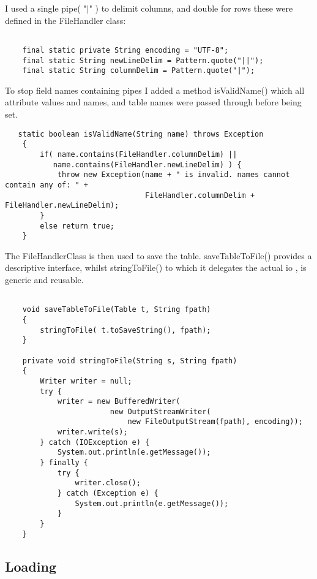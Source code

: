 \documentclass[11pt]{article} %
\begin{document}
I used a single pipe( "$\mid$" ) to delimit columns, and double for rows these were defined in the FileHandler class:
\begin{lstlisting}

    final static private String encoding = "UTF-8";
    final static String newLineDelim = Pattern.quote("||");
    final static String columnDelim = Pattern.quote("|");
\end{lstlisting}

To stop field names containing pipes I added a method isValidName() which all attribute values and names, and table names were passed through before being set.

\begin{lstlisting}
   static boolean isValidName(String name) throws Exception
    {
        if( name.contains(FileHandler.columnDelim) ||
           name.contains(FileHandler.newLineDelim) ) {
            throw new Exception(name + " is invalid. names cannot contain any of: " +
                                FileHandler.columnDelim + FileHandler.newLineDelim);
        }
        else return true;
    }
\end{lstlisting}


The FileHandlerClass is then used to save the table. saveTableToFile() provides a descriptive interface, whilst stringToFile() to which it delegates the actual io , is generic and reusable.
\begin{lstlisting}

    void saveTableToFile(Table t, String fpath)
    {
        stringToFile( t.toSaveString(), fpath);
    }

    private void stringToFile(String s, String fpath)
    {
        Writer writer = null;
        try {
            writer = new BufferedWriter(
                        new OutputStreamWriter(
                            new FileOutputStream(fpath), encoding));
            writer.write(s);
        } catch (IOException e) {
            System.out.println(e.getMessage());
        } finally {
            try {
                writer.close();
            } catch (Exception e) {
                System.out.println(e.getMessage());
            }
        }
    }
\end{lstlisting}






\subsection{Loading}
\end{document}
